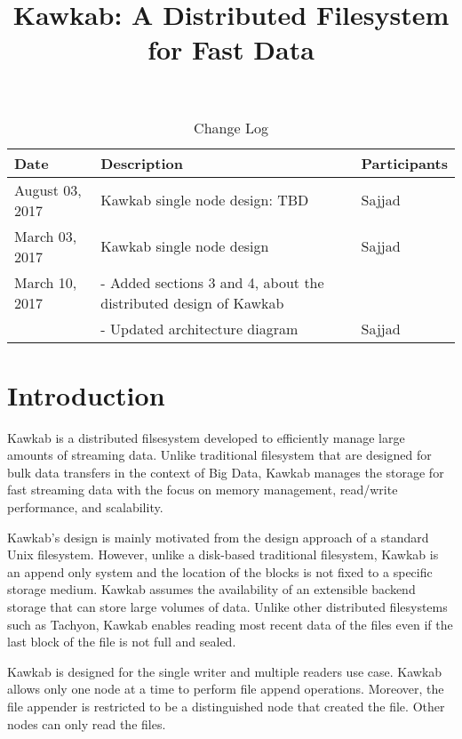 \documentclass[]{article}
\begin{document}
\title{Kawkab: A Distributed Filesystem for Fast Data}
\date{}
\maketitle

\bgroup
\def\arraystretch{1.5}
\begin{table}[!htb]
\centering
\caption{Change Log}
\label{table:change-log}
\begin{tabular}{|l|l|l|}
\hline
\rowcolor[HTML]{EFEFEF} 
Date             & Description  & Participants  \\ \hline
 August 03, 2017  & Kawkab single node design: TBD      & Sajjad  \\ \hline
 March 03, 2017  & Kawkab single node design           & Sajjad  \\ \hline
 March 10, 2017  & - Added sections 3 and 4, about the distributed design of Kawkab& \\ 
                 & - Updated architecture diagram & Sajjad  \\ \hline
\end{tabular}
\end{table}
\egroup


\section{Introduction} 

Kawkab is a distributed filsesystem developed to efficiently manage large
amounts of streaming data. Unlike traditional filesystem that are designed for
bulk data transfers in the context of Big Data, Kawkab manages the storage for
fast streaming data with the focus on memory management, read/write
performance, and scalability.


Kawkab's design is mainly motivated from the design approach of a standard Unix filesystem.
However, unlike a disk-based traditional filesystem, Kawkab is an append only
system  and the location of the blocks is not fixed to a specific storage
medium. Kawkab assumes the availability of an extensible backend storage that
can store large volumes of data. Unlike other distributed filesystems such
as Tachyon, Kawkab enables reading most recent data of the files even if the
last block of the file is not full and sealed. 

Kawkab is designed for the single writer and multiple readers use case. Kawkab
allows only one node at a time to perform file append operations. Moreover,
the file appender is restricted to be a distinguished node that created
the file. Other nodes can only read the files.
\end{document}
